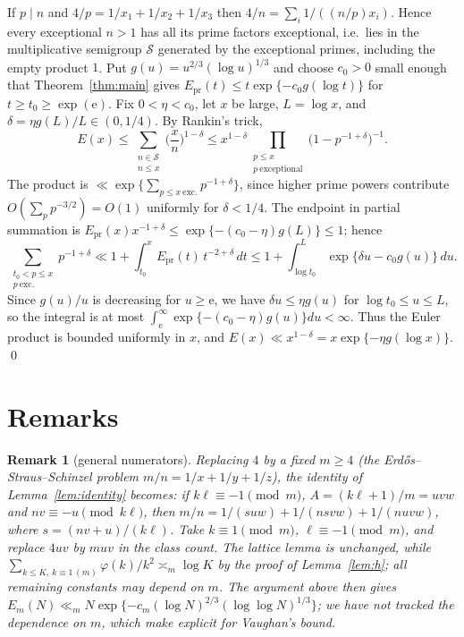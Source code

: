 \documentclass[11pt,reqno]{amsart}
\newtheorem{remark}[theorem]{Remark}
\newcommand{\e}{\mathrm e}
\newcommand{\cS}{\mathcal S}
\begin{document}
If $p\mid n$ and $4/p=1/x_1+1/x_2+1/x_3$ then
$4/n=\sum_i1/((n/p)x_i)$.  Hence every exceptional $n>1$ has all its prime
factors exceptional, i.e.\ lies in the multiplicative semigroup $\cS$
generated by the exceptional primes, including the empty product $1$.
Put $g(u)=u^{2/3}(\log u)^{1/3}$ and choose $c_0>0$ small enough that
Theorem~\ref{thm:main} gives
$E_{\mathrm{pr}}(t)\le t\exp\{-c_0g(\log t)\}$ for $t\ge t_0\ge\exp(\e)$.  Fix
$0<\eta<c_0$, let $x$ be large, $L=\log x$, and $\delta=\eta g(L)/L\in(0,1/4)$.
By Rankin's trick,
\[
 E(x)\le\sum_{\substack{n\in\cS\\ n\le x}}\Big(\frac xn\Big)^{1-\delta}
 \le x^{1-\delta}\prod_{\substack{p\le x\\ p\ \mathrm{exceptional}}}\big(1-p^{-1+\delta}\big)^{-1}.
\]
The product is $\ll\exp\{\sum_{p\le x\ \mathrm{exc.}}p^{-1+\delta}\}$, since
higher prime powers contribute $O(\sum_p p^{-3/2})=O(1)$ uniformly for $\delta<1/4$.
The endpoint in partial summation is
$E_{\mathrm{pr}}(x)x^{-1+\delta}\le\exp\{-(c_0-\eta)g(L)\}\le1$; hence
\[
 \sum_{\substack{t_0<p\le x\\ p\ \mathrm{exc.}}}p^{-1+\delta}
 \ll1+\int_{t_0}^{x}E_{\mathrm{pr}}(t)\,t^{-2+\delta}\,dt
 \le1+\int_{\log t_0}^{L}\exp\{\delta u-c_0g(u)\}\,du .
\]
Since $g(u)/u$ is decreasing for $u\ge\e$, we have $\delta u\le\eta g(u)$ for
$\log t_0\le u\le L$, so the integral is at most
$\int_{\e}^\infty\exp\{-(c_0-\eta)g(u)\}du<\infty$.  Thus the Euler product is
bounded uniformly in $x$, and $E(x)\ll x^{1-\delta}=x\exp\{-\eta g(\log x)\}$.
\qed

\section{Remarks}

\begin{remark}[general numerators]
Replacing $4$ by a fixed $m\ge4$ (the Erd\H{o}s--Straus--Schinzel problem
$m/n=1/x+1/y+1/z$), the identity of Lemma~\ref{lem:identity} becomes: if
$k\ell\equiv-1\pmod m$, $A=(k\ell+1)/m=uvw$ and $nv\equiv-u\pmod{k\ell}$, then
$m/n=1/(suw)+1/(nsvw)+1/(nuvw)$, where $s=(nv+u)/(k\ell)$.
Take $k\equiv1\pmod m$, $\ell\equiv-1\pmod m$, and replace $4uv$ by $muv$
in the class count.  The lattice lemma is unchanged, while
$\sum_{k\le K,\ k\equiv1\,(m)}\varphi(k)/k^2\asymp_m\log K$
by the proof of Lemma~\ref{lem:h}; all remaining constants may depend on $m$.
The argument above then gives
$E_m(N)\ll_m N\exp\{-c_m(\log N)^{2/3}(\log\log N)^{1/3}\}$; we have not
tracked the dependence on $m$, which \cite{PW} make explicit for Vaughan's
bound.
\end{remark}
\end{document}
